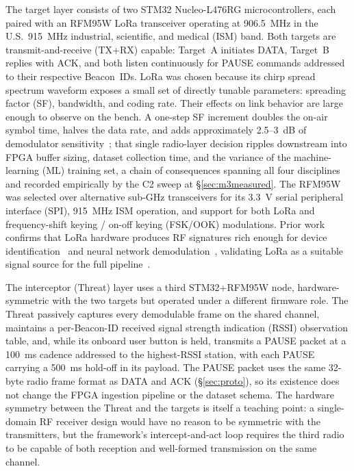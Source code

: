 \documentclass[conference]{IEEEtran}
\begin{document}
The target layer consists of two STM32 Nucleo-L476RG microcontrollers, each paired with an RFM95W LoRa transceiver operating at 906.5~MHz in the U.S.\ 915~MHz industrial, scientific, and medical (ISM) band. Both targets are transmit-and-receive (TX+RX) capable: Target~A initiates DATA, Target~B replies with ACK, and both listen continuously for PAUSE commands addressed to their respective Beacon~IDs. LoRa was chosen because its chirp spread spectrum waveform exposes a small set of directly tunable parameters: spreading factor (SF), bandwidth, and coding rate. Their effects on link behavior are large enough to observe on the bench. A one-step SF increment doubles the on-air symbol time, halves the data rate, and adds approximately 2.5--3~dB of demodulator sensitivity~\cite{b12}; that single radio-layer decision ripples downstream into FPGA buffer sizing, dataset collection time, and the variance of the machine-learning (ML) training set, a chain of consequences spanning all four disciplines and recorded empirically by the C2 sweep at \S\ref{sec:m3measured}. The RFM95W was selected over alternative sub-GHz transceivers for its 3.3~V serial peripheral interface (SPI), 915~MHz ISM operation, and support for both LoRa and frequency-shift keying / on-off keying (FSK/OOK) modulations. Prior work confirms that LoRa hardware produces RF signatures rich enough for device identification~\cite{b6} and neural network demodulation~\cite{b8}, validating LoRa as a suitable signal source for the full pipeline~\cite{b10,b13}.

The interceptor (Threat) layer uses a third STM32+RFM95W node, hardware-symmetric with the two targets but operated under a different firmware role. The Threat passively captures every demodulable frame on the shared channel, maintains a per-Beacon-ID received signal strength indication (RSSI) observation table, and, while its onboard user button is held, transmits a PAUSE packet at a 100~ms cadence addressed to the highest-RSSI station, with each PAUSE carrying a 500~ms hold-off in its payload. The PAUSE packet uses the same 32-byte radio frame format as DATA and ACK (\S\ref{sec:proto}), so its existence does not change the FPGA ingestion pipeline or the dataset schema. The hardware symmetry between the Threat and the targets is itself a teaching point: a single-domain RF receiver design would have no reason to be symmetric with the transmitters, but the framework's intercept-and-act loop requires the third radio to be capable of both reception and well-formed transmission on the same channel.
\end{document}

